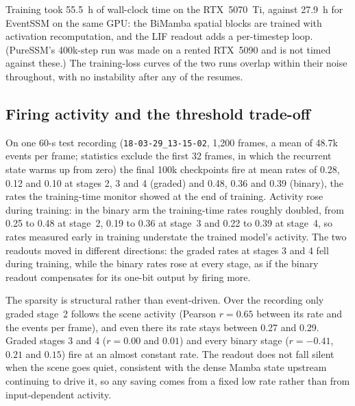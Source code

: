 \documentclass[11pt, a4paper]{report}
\begin{document}
Training took 55.5~h of wall-clock time on the RTX~5070~Ti, against 27.9~h for EventSSM on the same GPU: the
BiMamba spatial blocks are trained with activation recomputation, and the LIF readout adds a per-timestep
loop. (PureSSM's 400k-step run was made on a rented RTX~5090 and is not timed against these.) The training-loss curves of
the two runs overlap within their noise throughout, with no instability after any of the resumes.

\subsection{Firing activity and the threshold trade-off}
\label{subsec:spk_firing}
On one 60-s test recording (\texttt{18-03-29\_13-15-02}, 1{,}200 frames, a mean of 48.7k events per frame;
statistics exclude the first 32 frames, in which the recurrent state warms up from zero) the
final 100k checkpoints fire at mean rates of 0.28, 0.12 and 0.10 at stages 2, 3 and 4 (graded) and 0.48,
0.36 and 0.39 (binary), the rates the training-time monitor showed at the end of training. Activity rose
during training: in the binary arm the training-time rates roughly doubled, from 0.25 to 0.48 at stage~2,
0.19 to 0.36 at stage~3 and 0.22 to 0.39 at stage~4, so rates measured early in training understate the
trained model's activity. The two readouts moved in different directions: the graded rates at stages 3
and 4 fell during training, while the binary rates rose at every stage, as if the binary readout compensates
for its one-bit output by firing more.

The sparsity is structural rather than event-driven. Over the recording only graded stage~2 follows the
scene activity (Pearson $r = 0.65$ between its rate and the events per frame), and even there its rate stays
between 0.27 and 0.29. Graded stages 3 and 4 ($r = 0.00$ and $0.01$) and every binary stage ($r = -0.41$, $0.21$
and $0.15$) fire at an almost constant rate. The readout does not fall silent when the scene goes quiet,
consistent with the dense Mamba state upstream continuing to drive it, so any saving comes from a fixed low
rate rather than from input-dependent activity.
\end{document}
